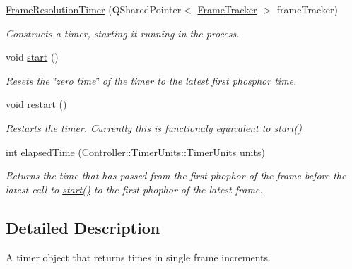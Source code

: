 \begin{DoxyCompactItemize}
\item 
\hyperlink{class_picto_1_1_controller_1_1_frame_resolution_timer_af6303d604eff74be9bb79b00ea458b2e}{Frame\-Resolution\-Timer} (Q\-Shared\-Pointer$<$ \hyperlink{struct_picto_1_1_controller_1_1_frame_tracker}{Frame\-Tracker} $>$ frame\-Tracker)
\begin{DoxyCompactList}\small\item\em Constructs a timer, starting it running in the process. \end{DoxyCompactList}\item 
void \hyperlink{class_picto_1_1_controller_1_1_frame_resolution_timer_afd3ea47b095ea4225b61bdcde9b07e88}{start} ()
\begin{DoxyCompactList}\small\item\em Resets the \char`\"{}zero time\char`\"{} of the timer to the latest first phosphor time. \end{DoxyCompactList}\item 
\hypertarget{class_picto_1_1_controller_1_1_frame_resolution_timer_aa94a4bedc8e690e59a5adee95a3dda2f}{void \hyperlink{class_picto_1_1_controller_1_1_frame_resolution_timer_aa94a4bedc8e690e59a5adee95a3dda2f}{restart} ()}\label{class_picto_1_1_controller_1_1_frame_resolution_timer_aa94a4bedc8e690e59a5adee95a3dda2f}

\begin{DoxyCompactList}\small\item\em Restarts the timer. Currently this is functionaly equivalent to \hyperlink{class_picto_1_1_controller_1_1_frame_resolution_timer_afd3ea47b095ea4225b61bdcde9b07e88}{start()} \end{DoxyCompactList}\item 
int \hyperlink{class_picto_1_1_controller_1_1_frame_resolution_timer_a5b3ecce7dba5d83dea3a8e6e5100e09c}{elapsed\-Time} (Controller\-::\-Timer\-Units\-::\-Timer\-Units units)
\begin{DoxyCompactList}\small\item\em Returns the time that has passed from the first phophor of the frame before the latest call to \hyperlink{class_picto_1_1_controller_1_1_frame_resolution_timer_afd3ea47b095ea4225b61bdcde9b07e88}{start()} to the first phophor of the latest frame. \end{DoxyCompactList}\end{DoxyCompactItemize}


\subsection{Detailed Description}
A timer object that returns times in single frame increments. 

